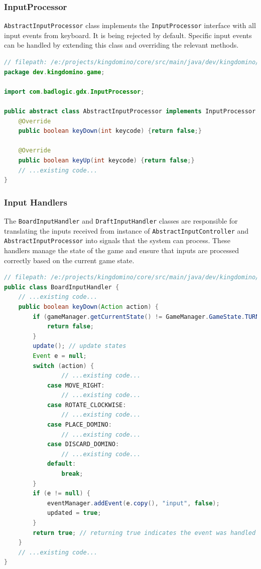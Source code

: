 \documentclass[conference]{IEEEtran}
\begin{document}
\subsubsection{InputProcessor}
\texttt{AbstractInputProcessor} class implements the
\texttt{InputProcessor} interface with all input events from keyboard. It is
being rejected by default. Specific input events can be handled by extending
this class and overriding the relevant methods.

\begin{lstlisting}[language=Java]
// filepath: /e:/projects/kingdomino/core/src/main/java/dev/kingdomino/game/AbstractInputProcessor.java
package dev.kingdomino.game;

import com.badlogic.gdx.InputProcessor;

public abstract class AbstractInputProcessor implements InputProcessor {
    @Override
    public boolean keyDown(int keycode) {return false;}

    @Override
    public boolean keyUp(int keycode) {return false;}
    // ...existing code...
}
\end{lstlisting}

\subsubsection{Input Handlers}
The \texttt{BoardInputHandler} and \texttt{DraftInputHandler} classes are
responsible for translating the inputs received from instance of
\texttt{AbstractInputController} and \texttt{AbstractInputProcessor} into
signals that the system can process. These handlers manage the state of the
game and ensure that inputs are processed correctly based on the current game
state.

\begin{lstlisting}[language=Java]
// filepath: /e:/projects/kingdomino/core/src/main/java/dev/kingdomino/game/BoardInputHandler.java
public class BoardInputHandler {
    // ...existing code...
    public boolean keyDown(Action action) {
        if (gameManager.getCurrentState() != GameManager.GameState.TURN_PLACING) {
            return false;
        }
        update(); // update states
        Event e = null;
        switch (action) {
                // ...existing code...
            case MOVE_RIGHT:
                // ...existing code...
            case ROTATE_CLOCKWISE:
                // ...existing code...
            case PLACE_DOMINO:
                // ...existing code...
            case DISCARD_DOMINO:
                // ...existing code...
            default:
                break;
        }
        if (e != null) {
            eventManager.addEvent(e.copy(), "input", false);
            updated = true;
        }
        return true; // returning true indicates the event was handled
    }
    // ...existing code...
}
\end{lstlisting}
\end{document}

